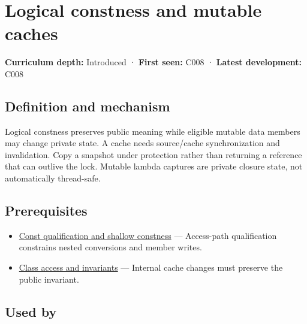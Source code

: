 \hypertarget{appendix-f5593256bcaf}{}\label{referencestart:appendix-f5593256bcaf}
\section{Logical constness and mutable caches}\label{appendix-f5593256bcaf-logical-constness-and-mutable-caches}

\hypertarget{appendix-f5593256bcaf-logical-constness-and-mutable-caches}{}

\textbf{Curriculum depth:} Introduced · \textbf{First seen:} C008 · \textbf{Latest development:} C008

\begin{allmightroledefinition}

\subsection{Definition and mechanism}\label{appendix-f5593256bcaf-definition-and-mechanism}

\hypertarget{appendix-f5593256bcaf-definition-and-mechanism}{}

Logical constness preserves public meaning while eligible mutable data members may change private state. A cache needs source/cache synchronization and invalidation. Copy a snapshot under protection rather than returning a reference that can outlive the lock. Mutable lambda captures are private closure state, not automatically thread-safe.

\end{allmightroledefinition}

\subsection{Prerequisites}\label{appendix-f5593256bcaf-prerequisites}

\hypertarget{appendix-f5593256bcaf-prerequisites}{}

\begin{itemize}
\tightlist
\item
  \hyperref[appendix-c25d60fed375]{Const qualification and shallow constness} --- Access-path qualification constrains nested conversions and member writes.
\item
  \hyperref[appendix-8e5214819615]{Class access and invariants} --- Internal cache changes must preserve the public invariant.
\end{itemize}

\subsection{Used by}\label{appendix-f5593256bcaf-used-by}

